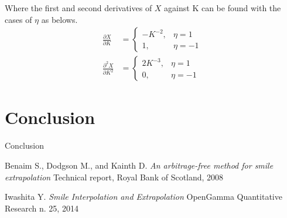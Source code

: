 \documentclass{article}
\begin{document}
Where the first and second derivatives of $ X $ against K can be found with the cases of $ \eta $ as belows.
\begin{subequations}
    \begin{align}
        \frac{\partial X}{\partial K} &= 
        \begin{cases}
            -K^{-2}, &\eta = 1 \\
            1, &\eta = -1
        \end{cases}\\
        \frac{\partial^2 X}{\partial K^2} &= 
        \begin{cases}
            2 K^{-3}, &\eta = 1 \\
            0, &\eta = -1
        \end{cases}
    \end{align}
\end{subequations}


\section{Conclusion}

Conclusion


\begin{thebibliography}{9}
    Benaim S., Dodgson M., and Kainth D.
    \textit{An arbitrage-free method for smile extrapolation}
    Technical report, Royal Bank of Scotland, 2008
    
    Iwashita Y.
    \textit{Smile Interpolation and Extrapolation}
    OpenGamma Quantitative Research n. 25, 2014
\end{thebibliography}
\end{document}
